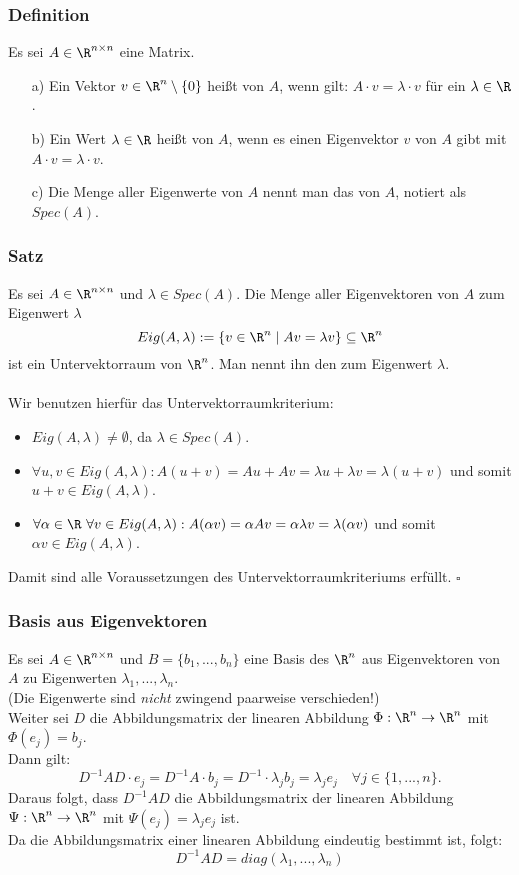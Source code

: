 \begin{frame}\frametitle{Definition}
Es sei $A\in\R^{n\times n}$ eine Matrix. \pause \vfill
\begin{itemize}
\item[a)] Ein Vektor $v \in \R^n\setminus \{0\}$ heißt  von $A$, wenn gilt: $A\cdot v = \lambda \cdot v$ für ein $\lambda \in \R$.\pause \vfill
\item[b)] Ein Wert $\lambda \in \R$ heißt  von $A$, wenn es einen Eigenvektor $v$ von $A$ gibt mit $A\cdot v = \lambda\cdot v$.\pause \vfill
\item[c)] Die Menge aller Eigenwerte von $A$ nennt man das  von $A$, notiert als $Spec(A)$.
\end{itemize}
	
\end{frame}
%
%
\begin{frame}\frametitle{Satz}
Es sei $A\in \R^{n\times n}$ und $\lambda \in Spec(A)$. Die Menge aller Eigenvektoren von $A$ zum Eigenwert $\lambda$
$$
Eig(A,\lambda):=\{v \in \R^n \mid Av=\lambda v\}\subseteq \R^n
$$
ist ein Untervektorraum von $\R^n$. Man nennt ihn den  zum Eigenwert $\lambda$.\\\vfill \pause
{}\\
Wir benutzen hierfür das Untervektorraumkriterium: \pause
\begin{itemize}
\item $Eig(A,\lambda) \ne \emptyset$, da $\lambda \in Spec(A)$. \pause
\item $\forall u,v \in Eig(A,\lambda): A(u+v)=Au +Av = \lambda u + \lambda v = \lambda (u+v)$ und somit $u+v \in Eig(A,\lambda)$.\pause
\item $\forall \alpha \in \R \ \forall v \in Eig(A,\lambda): A(\alpha v)=\alpha Av=\alpha \lambda v=\lambda(\alpha v)$ und somit $\alpha v \in Eig(A,\lambda)$.\pause
\end{itemize}	
Damit sind alle Voraussetzungen des Untervektorraumkriteriums erfüllt. \hfill $\square$
\end{frame}
%
%
\begin{frame}\frametitle{Basis aus Eigenvektoren}
Es sei $A \in \R^{n \times n}$ und $B=\{b_1,...,b_n\}$ eine Basis des $\R^n$ aus Eigenvektoren von $A$ zu Eigenwerten $\lambda_1,...,\lambda_n$. \\(Die Eigenwerte sind \textit{nicht} zwingend paarweise verschieden!)\\\pause
Weiter sei $D$ die Abbildungsmatrix der linearen Abbildung $\Phi: \R^n \to \R^n$ mit $\Phi(e_j)=b_j$.\pause\\ Dann gilt:
$$
D^{-1}AD\cdot e_j =D^{-1}A\cdot b_j=D^{-1}\cdot\lambda_j b_j=\lambda_j e_j \quad \forall j \in \{1,...,n\}.
$$\pause
Daraus folgt, dass $D^{-1}AD$ die Abbildungsmatrix der linearen Abbildung $\Psi:\R^n \to \R^n$ mit $\Psi(e_j)=\lambda_j e_j$ ist.\pause \\Da die Abbildungsmatrix einer linearen Abbildung eindeutig bestimmt ist, folgt:
$$
D^{-1}AD=diag(\lambda_1,...,\lambda_n)
$$
\end{frame}
